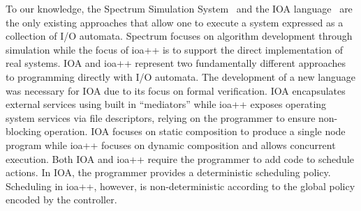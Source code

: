 

To our knowledge, the Spectrum Simulation System~\cite{goldman1990distributed} and the IOA language~\cite{garland2003ioa} are the only existing approaches that allow one to execute a system expressed as a collection of I/O automata.
Spectrum focuses on algorithm development through simulation while the focus of ioa++ is to support the direct implementation of real systems.
IOA and ioa++ represent two fundamentally different approaches to programming directly with I/O automata.
The development of a new language was necessary for IOA due to its focus on formal verification.
IOA encapsulates external services using built in ``mediators'' while ioa++ exposes operating system services via file descriptors, relying on the programmer to ensure non-blocking operation.
IOA focuses on static composition to produce a single node program while ioa++ focuses on dynamic composition and allows concurrent execution.
Both IOA and ioa++ require the programmer to add code to schedule actions.
In IOA, the programmer provides a deterministic scheduling policy.
Scheduling in ioa++, however, is non-deterministic according to the global policy encoded by the controller.

